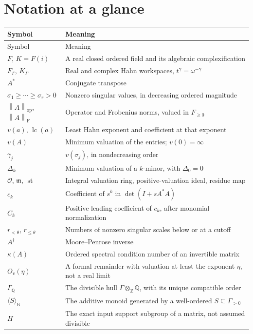 \documentclass[11pt,a4paper]{article}
\numberwithin{equation}{section}
\theoremstyle{definition}
\theoremstyle{remark}
\newcommand{\Q}{\mathbb Q}
\newcommand{\N}{\mathbb N}
\newcommand{\Z}{\mathbb Z}
\newcommand{\OO}{\mathcal O}
\newcommand{\mm}{\mathfrak m}
\newcommand{\st}{\operatorname{st}}
\newcommand{\lc}{\operatorname{lc}}
\newcommand{\op}{\mathrm{op}}
\newcommand{\Fr}{\mathrm F}
\newcommand{\norm}[1]{\left\lVert#1\right\rVert}
\begin{document}
\section{Notation at a glance}
\begin{longtable}{@{}P{.27\textwidth}P{.67\textwidth}@{}}
\toprule Symbol & Meaning\\\midrule\endfirsthead
\toprule Symbol & Meaning\\\midrule\endhead
$F$, $K=F(i)$ & A real closed ordered field and its algebraic complexification\\
$F_\Gamma$, $K_\Gamma$ & Real and complex Hahn workspaces, $t^\gamma=\omega^{-\gamma}$\\
$A^*$ & Conjugate transpose\\
$\sigma_1\ge\cdots\ge\sigma_r>0$ & Nonzero singular values, in decreasing ordered magnitude\\
$\norm A_{\op}$, $\norm A_{\Fr}$ & Operator and Frobenius norms, valued in $F_{\ge0}$\\
$v(a)$, $\lc(a)$ & Least Hahn exponent and coefficient at that exponent\\
$v(A)$ & Minimum valuation of the entries; $v(0)=\infty$\\
$\gamma_j$ & $v(\sigma_j)$, in nondecreasing order\\
$\Delta_k$ & Minimum valuation of a $k$-minor, with $\Delta_0=0$\\
$\OO$, $\mm$, $\st$ & Integral valuation ring, positive-valuation ideal, residue map\\
$c_k$ & Coefficient of $s^k$ in $\det(I+sA^*A)$\\
$C_k$ & Positive leading coefficient of $c_k$, after monomial normalization\\
$r_{<\theta}$, $r_{\le\theta}$ & Numbers of nonzero singular scales below or at a cutoff\\
$A^\dagger$ & Moore--Penrose inverse\\
$\kappa(A)$ & Ordered spectral condition number of an invertible matrix\\
$O_v(\eta)$ & A formal remainder with valuation at least the exponent $\eta$, not a real limit\\
$\Gamma_\Q$ & The divisible hull $\Gamma\otimes_\Z\Q$, with its unique compatible order\\
$\langle S\rangle_\N$ & The additive monoid generated by a well-ordered $S\subseteq\Gamma_{>0}$\\
$H$ & The exact input support subgroup of a matrix, not assumed divisible\\

\end{longtable}
\end{document}
